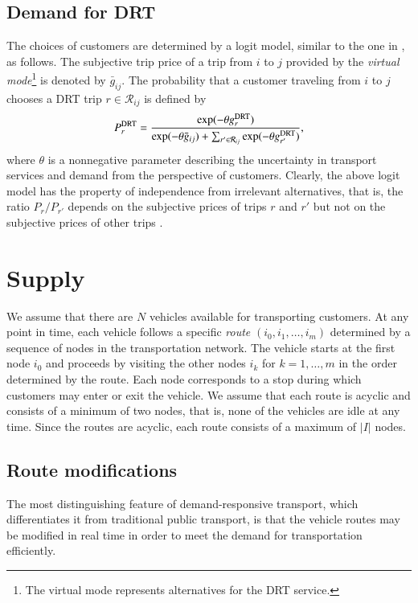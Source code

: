 \documentclass[dissertation,draft*]{aaltoseries}
\begin{document}
\subsection{Demand for DRT}
The choices of customers are determined by a logit model, similar to the one in \citep{yang2010}, as follows.
The subjective trip price of a trip from $i$ to $j$ provided by the \emph{virtual mode}\footnote{The virtual mode 
represents alternatives for the DRT service.} is denoted by $\bar{g}_{ij}$.
The probability that a customer traveling from $i$ to $j$ chooses a DRT trip $r \in \mathcal{R}_{ij}$ is defined by
\begin{align}
\label{kysyntatn}
P_{r}^{\rm DRT} = 
\frac{\exp(-\theta g_{r}^{\rm DRT})}{\exp(-\theta \bar{g}_{ij}) + \sum_{r' \in \mathcal{R}_{ij}}\exp(-\theta g_{r'}^{\rm DRT})},
\end{align}
where $\theta$ is a nonnegative parameter describing the uncertainty in transport services and demand
from the perspective of customers.  
Clearly, the above logit model has the property of independence from irrelevant alternatives, that is, 
the ratio $P_{r}/P_{r'}$ depends on the subjective prices of trips $r$ and $r'$ but
not on the subjective prices of other trips \citep{small2007}.


\section{Supply}
\label{vehiclemovements}
We assume that there are $N$ vehicles available for transporting customers. 
At any point in time, each vehicle follows a specific \emph{route} $(i_0,i_1,\ldots,i_m)$ 
determined by a sequence of nodes in the transportation network.
The vehicle starts at the first node $i_0$ and proceeds by visiting the other nodes $i_k$
for $k=1,\ldots,m$ in the order determined by the route.
Each node corresponds to a stop during which customers may enter or exit the vehicle.
We assume that each route is acyclic and consists of a minimum of two nodes, that is, none of the
vehicles are idle at any time. Since the routes are acyclic, each route consists of
a maximum of $|I|$ nodes.



\subsection{Route modifications}
\label{routemodifications}
The most distinguishing feature of demand-responsive transport, which differentiates it from 
traditional public transport, is that the vehicle routes may be modified in
real time in order to meet the demand for transportation efficiently.
\end{document}
